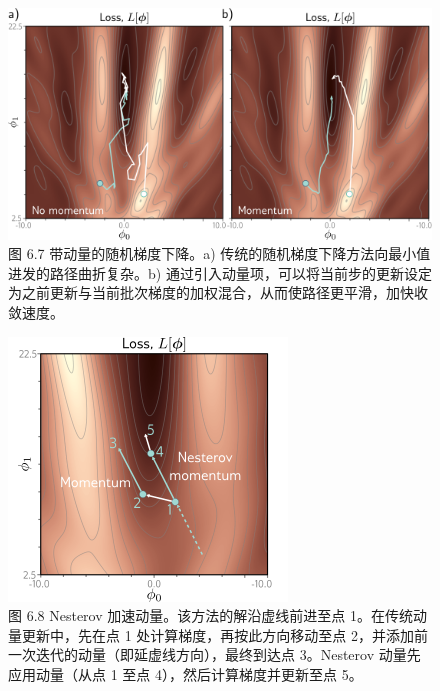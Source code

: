 \begin{figure}[ht!]
\centering
\includegraphics[width=0.7\linewidth]{png/chapter6/TrainMomentum.png}
\caption{图 6.7 带动量的随机梯度下降。a) 传统的随机梯度下降方法向最小值进发的路径曲折复杂。b) 通过引入动量项，可以将当前步的更新设定为之前更新与当前批次梯度的加权混合，从而使路径更平滑，加快收敛速度。}
\end{figure}

\begin{figure}[ht!]
\centering
\includegraphics[width=0.7\linewidth]{png/chapter6/TrainNesterov.png}
\caption{图 6.8 Nesterov 加速动量。该方法的解沿虚线前进至点 1。在传统动量更新中，先在点 1 处计算梯度，再按此方向移动至点 2，并添加前一次迭代的动量（即延虚线方向），最终到达点 3。Nesterov 动量先应用动量（从点 1 至点 4），然后计算梯度并更新至点 5。}
\end{figure}

